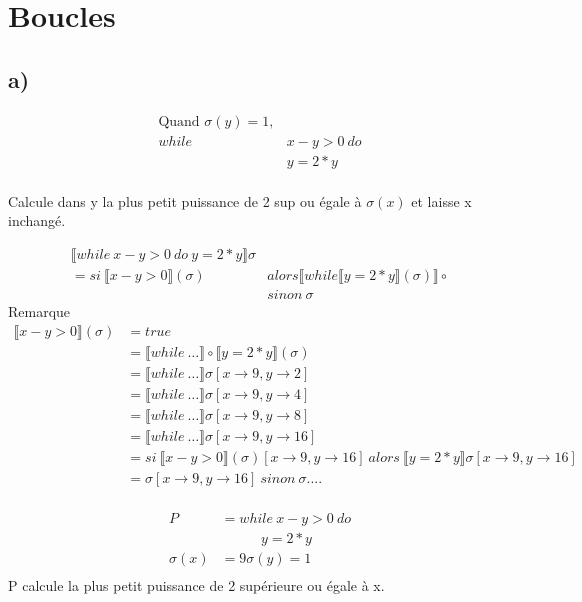 \documentclass[11pt,a4paper]{article}
\newcommand{\llbr}{\llbracket}
\newcommand{\rrbr}{\rrbracket}
\begin{document}
	\section{Boucles}
	
	\subsection{a)}
	
	\begin{align*}
		\text{Quand } \sigma(y) = 1,&\\
		while\ &x - y > 0\ do\\
			&y = 2 * y\\
	\end{align*}
	
	Calcule dans y la plus petit puissance de 2 sup ou égale à $\sigma(x)$ et laisse x inchangé.
	
	\begin{align*}
		 \llbr while\ x - y > 0\ do\ y = 2 * y  \rrbr\sigma&\\
		= si\  \llbr x - y > 0  \rrbr(\sigma) &alors  \llbr while  \llbr y = 2 * y  \rrbr(\sigma) \rrbr \circ\\
		&sinon\ \sigma
	\end{align*}
	Remarque
	\begin{align*}
	 \llbr x - y > 0  \rrbr(\sigma) &= true\\
	&=  \llbr while\ \ldots  \rrbr \circ  \llbr y = 2 * y  \rrbr(\sigma)\\
	&= \llbr while\ \ldots \rrbr \sigma [ x \to 9, y \to 2]\\
	&= \llbr while\ \ldots \rrbr \sigma [x \to 9, y \to 4]\\
	&= \llbr while\ \ldots \rrbr \sigma [x \to 9, y \to 8]\\
	&= \llbr while\ \ldots \rrbr \sigma [x \to 9, y \to 16]\\
	&= si\  \llbr x - y > 0 \rrbr (\sigma) [x \to 9, y \to 16]\ alors\ \llbr y = 2 * y \rrbr \sigma [x \to 9, y \to 16]\\
	&= \sigma [x \to 9, y \to 16]\ sinon\ \sigma ....\\
	\end{align*}
	
	
	\begin{align*}
		P &= while\ x - y > 0\ do\\
		&\ \ \ \ \ \ \ \ \ \ \ \ \ y = 2 * y\\
		\sigma(x) &= 9 \sigma(y) = 1\\
	\end{align*}
	P calcule la plus petit puissance de 2 supérieure ou égale à x.
	
\end{document}
